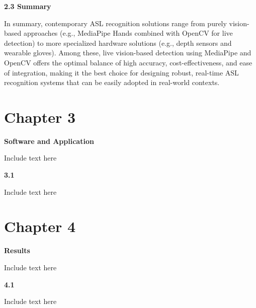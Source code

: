 \documentclass[12pt]{article}
\begin{document}
\vspace{1.5em}
\noindent
\textbf{2.3 Summary}
\vspace{1em}

In summary, contemporary ASL recognition solutions range from purely vision-based 
approaches (e.g., MediaPipe Hands combined with OpenCV for live detection) to more 
specialized hardware solutions (e.g., depth sensors and wearable gloves). Among these, live 
vision-based detection using MediaPipe and OpenCV offers the optimal balance of high 
accuracy, cost-effectiveness, and ease of integration, making it the best choice for designing 
robust, real-time ASL recognition systems that can be easily adopted in real-world contexts.



\newpage
\section*{Chapter 3}
\begin{center}
\large \textbf{Software and Application}
\end{center}

Include text here

\vspace{1.5em}
\noindent
\textbf{3.1 }
\vspace{1.5em}

Include text here

\newpage
\section*{Chapter 4}
\begin{center}
\large \textbf{Results}
\end{center}

Include text here

\vspace{1.5em}
\noindent
\textbf{4.1 }
\vspace{1.5em}

Include text here

\newpage
\end{document}
